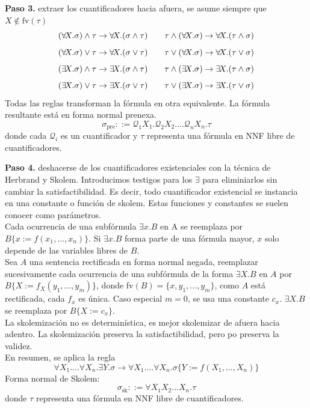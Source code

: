 \documentclass[12pt]{extarticle}
\def\ssspace{\space\space\space}
\begin{document}
\textbf{Paso 3.} extraer los cuantificadores hacia afuera, se asume siempre que $X \not\in \text{fv}(\tau)$
$$(\forall\!X.\sigma)\land\tau\rightarrow\forall\!X.(\sigma\land\tau) \text{\ssspace\ssspace}
\tau\land(\forall\!X.\sigma)\rightarrow\forall\!X.(\tau\land\sigma) $$
$$(\forall\!X.\sigma)\lor\tau\rightarrow\forall\!X.(\sigma\lor\tau) \text{\ssspace\ssspace}
\tau\lor(\forall\!X.\sigma)\rightarrow\forall\!X.(\tau\lor\sigma) $$
$$(\exists\!X.\sigma)\land\tau\rightarrow\exists\!X.(\sigma\land\tau) \text{\ssspace\ssspace}
\tau\land(\exists\!X.\sigma)\rightarrow\exists\!X.(\tau\land\sigma) $$
$$(\exists\!X.\sigma)\lor\tau\rightarrow\exists\!X.(\sigma\lor\tau) \text{\ssspace\ssspace}
\tau\lor(\exists\!X.\sigma)\rightarrow\exists\!X.(\tau\lor\sigma) $$
Todas las reglas transforman la fórmula en otra equivalente. La fórmula resultante está en forma normal prenexa.
$$\sigma_{\text{pre}} ::= \mathcal{Q}_1X_1.\mathcal{Q}_2X_2. ...\mathcal{Q}_nX_n.\tau$$
donde cada $\mathcal{Q}_i$ es un cuantificador y $\tau$ representa una fórmula en NNF libre de cuantificadores.

\textbf{Paso 4.} deshacerse de los cuantificadores existenciales con la técnica de Herbrand y Skolem. Introducimos testigos para los $\exists$ para eliminiarlos sin cambiar la satisfactibilidad. Es decir, todo cuantificador existencial se instancia en una constante o función de skolem. Estas funciones y constantes se suelen conocer como parámetros. \\
Cada ocurrencia de una subfórmula $\exists\!x.B$ en A se reemplaza por $B\{x := f(x_1,...,x_n)\}$. Si $\exists\!x.B$ forma parte de una fórmula mayor, $x$ solo depende de las variables libres de $B$. \\
Sea $A$ una sentencia rectificada en forma normal negada, reemplazar sucesivamente cada ocurrencia de una subfórmula de la forma $\exists X. B$ en $A$ por $B\{X := f_X(y_1,...,y_m)\}$, donde fv$(B) = \{x,y_1,...,y_m\}$, como $A$ está rectificada, cada $f_x$ es única. Caso especial $m = 0$, se usa una constante $c_x$. $\exists\!X.B$ se reemplaza por $B\{X := c_x\}$. \\
La skolemización no es determinística, es mejor skolemizar de afuera hacia adentro. La skolemización preserva la satisfactibilidad, pero po preserva la validez. \\
En resumen, se aplica la regla
$$\forall\!X_1....\forall\!X_n.\exists\!Y.\sigma\rightarrow\forall\!X_1....\forall\!X_n.\sigma\{Y:=f(X_1,...,X_n)\}$$
Forma normal de Skolem:
$$\sigma_\text{sk} ::= \forall\!X_1X_2...X_n.\tau$$
donde $\tau$ representa una fórmula en NNF libre de cuantificadores.
\end{document}
